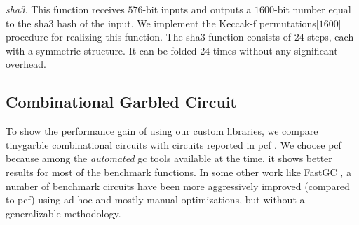 \textit{\acrshort{sha}3.} This function receives $576$-bit inputs and outputs a $1600$-bit number equal to the \acrshort{sha}3 hash of the input.
We implement the Keccak-f permutations[$1600$] procedure for realizing this function.
The \acrshort{sha}3 function consists of 24 steps, each with a symmetric structure.
It can be folded 24 times without any significant overhead.

\subsection{Combinational Garbled Circuit}\label{ssec:eval-tinygarble-comb}
To show the performance gain of using our custom libraries, we compare \gls{tinygarble} combinational circuits with circuits reported in \gls{pcf} \cite{kreuter2013pcf}.
We choose \gls{pcf} because among the \emph{automated} \acrshort{gc} tools available at the time, it shows better results for most of the benchmark functions.
In some other work like FastGC \cite{huang2011faster}, a number of benchmark circuits have been more aggressively improved (compared to \gls{pcf}) using ad-hoc and mostly manual optimizations, but without a generalizable methodology.

